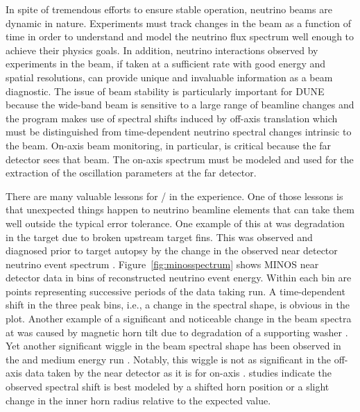 In spite of tremendous efforts to ensure stable operation, neutrino beams are dynamic in nature.  Experiments must track changes in the beam as a function of time in order to  understand and model the neutrino flux spectrum well enough to achieve their physics goals. In addition, neutrino interactions observed by experiments in the beam, if taken at a sufficient rate with good energy and spatial resolutions, can provide unique and invaluable information as a beam diagnostic. The issue of beam stability is particularly important for DUNE because the wide-band beam is sensitive to a large range of beamline changes and the  program makes use of spectral shifts induced by off-axis translation which must be distinguished from time-dependent neutrino spectral changes intrinsic to the beam.  On-axis beam monitoring, in particular, is critical because the  far detector sees that beam.  The on-axis spectrum must be modeled and used for the extraction of the oscillation parameters at the far detector.  

There are many valuable lessons for / in the  experience. One of those lessons is that unexpected things happen to neutrino beamline elements that can take them well outside the typical error tolerance.  One example of this at  was degradation in the target due to broken upstream target fins.  This was observed and diagnosed prior to target autopsy by the change in the observed near detector neutrino event spectrum \cite{Holin2017}.  Figure~\ref{fig:minosspectrum} shows MINOS near detector data in bins of reconstructed neutrino event energy.  Within each bin are points representing successive periods of the data taking run.  A time-dependent shift in the three peak bins, i.e., a change in the spectral shape, is obvious in the plot. Another example of a significant and noticeable change in the beam spectra at  was caused by magnetic horn tilt due to degradation of a supporting washer \cite{Hylen2016}.  Yet another significant wiggle in the beam spectral shape has been observed in the  and  medium energy run \cite{JenaNUINT2018}.  Notably, this wiggle is not as significant in the off-axis data taken by the  near detector as it is for on-axis .   studies indicate the observed spectral shift is best modeled by a shifted horn position or a slight change in the inner horn radius relative to the expected value.

